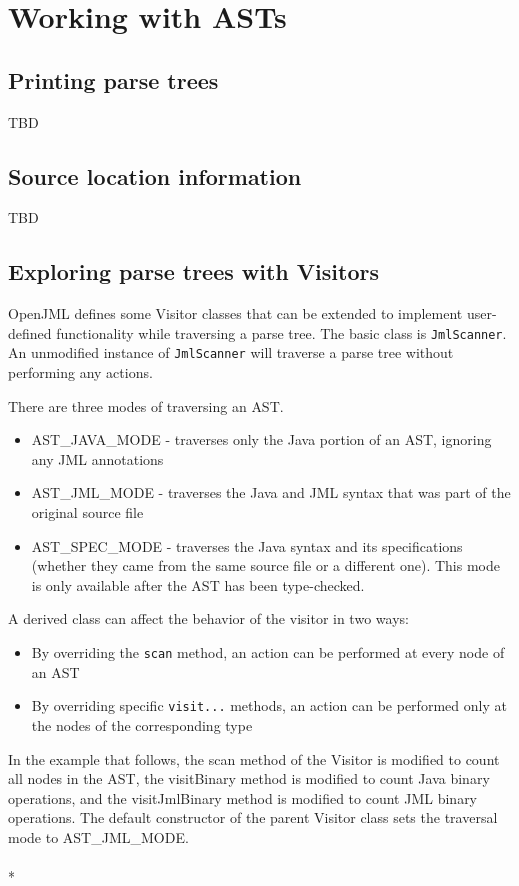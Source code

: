\documentclass{report}%
\newcommand{\boxspace}{\vspace*{6pt}}
\newcommand{\boxedinputc}[2]{\boxspace \\ \fbox{\parbox{6.00in}{\tt }} \fcolorbox{black}{gray}{\parbox{6.00in}{\tt }} \boxspace\\*}
\newcommand{\source}{../demos}
\newcommand{\demo}[1]{\boxedinputc{\source/#1.java}{\source/#1.txt}}
\begin{document}
\section{Working with ASTs}

\subsection{Printing parse trees}

TBD

\subsection{Source location information}

TBD

\subsection{Exploring parse trees with Visitors}
OpenJML defines some Visitor classes that can be extended to implement user-defined functionality while traversing a parse tree.
The basic class is {\tt JmlScanner}. An unmodified instance of {\tt JmlScanner} will traverse a parse tree without performing
any actions.

There are three modes of traversing an AST.
\begin{itemize}
\item AST\_JAVA\_MODE - traverses only the Java portion of an AST, ignoring any JML annotations
\item AST\_JML\_MODE - traverses the Java and JML syntax that was part of the original source file
\item AST\_SPEC\_MODE - traverses the Java syntax and its specifications (whether they came from the same source file or a different one). This mode is only available after the AST has been type-checked.
\end{itemize}

A derived class can affect the behavior of the visitor in two ways:
\begin{itemize}
\item By overriding the {\tt scan} method, an action can be performed at every node of an AST
\item By overriding specific {\tt visit...} methods, an action can be performed only at the nodes of the corresponding type
\end{itemize}

In the example that follows, the scan method of the Visitor is modified to count all nodes in the AST, the visitBinary method
is modified to count Java binary operations, and the visitJmlBinary method is modified to count JML binary operations.
The default constructor of the parent Visitor class sets the traversal mode to AST\_JML\_MODE.
\demo{DemoWalkTree1}
\end{document}
